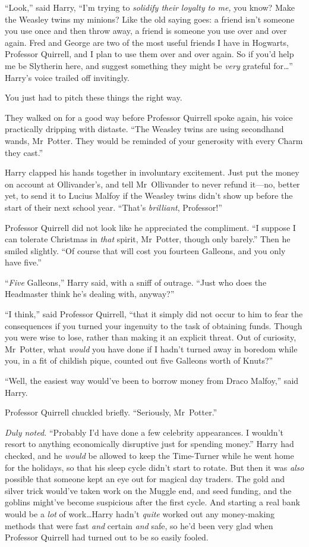 “Look,” said Harry, “I’m trying to \emph{solidify their loyalty to me,} you know? Make the Weasley twins my minions? Like the old saying goes: a friend isn’t someone you use once and then throw away, a friend is someone you use over and over again. Fred and George are two of the most useful friends I have in Hogwarts, Professor Quirrell, and I plan to use them over and over again. So if you’d help me be Slytherin here, and suggest something they might be \emph{very} grateful for…” Harry’s voice trailed off invitingly.

You just had to pitch these things the right way.

They walked on for a good way before Professor Quirrell spoke again, his voice practically dripping with distaste. “The Weasley twins are using secondhand wands, Mr~Potter. They would be reminded of your generosity with every Charm they cast.”

Harry clapped his hands together in involuntary excitement. Just put the money on account at Ollivander’s, and tell Mr~Ollivander to never refund it—no, better yet, to send it to Lucius Malfoy if the Weasley twins didn’t show up before the start of their next school year. “That’s \emph{brilliant}, Professor!”

Professor Quirrell did not look like he appreciated the compliment. “I suppose I can tolerate Christmas in \emph{that} spirit, Mr~Potter, though only barely.” Then he smiled slightly. “Of course that will cost you fourteen Galleons, and you only have five.”

“\emph{Five} Galleons,” Harry said, with a sniff of outrage. “Just who does the Headmaster think he’s dealing with, anyway?”

“I think,” said Professor Quirrell, “that it simply did not occur to him to fear the consequences if you turned your ingenuity to the task of obtaining funds. Though you were wise to lose, rather than making it an explicit threat. Out of curiosity, Mr~Potter, what \emph{would} you have done if I hadn’t turned away in boredom while you, in a fit of childish pique, counted out five Galleons worth of Knuts?”

“Well, the easiest way would’ve been to borrow money from Draco Malfoy,” said Harry.

Professor Quirrell chuckled briefly. “Seriously, Mr~Potter.”

\emph{Duly noted.} “Probably I’d have done a few celebrity appearances. I wouldn’t resort to anything economically disruptive just for spending money.” Harry had checked, and he \emph{would} be allowed to keep the Time-Turner while he went home for the holidays, so that his sleep cycle didn’t start to rotate. But then it was \emph{also} possible that someone kept an eye out for magical day traders. The gold and silver trick would’ve taken work on the Muggle end, and seed funding, and the goblins might’ve become suspicious after the first cycle. And starting a real bank would be a \emph{lot} of work…Harry hadn’t \emph{quite} worked out any money-making methods that were fast \emph{and} certain \emph{and} safe, so he’d been very glad when Professor Quirrell had turned out to be so easily fooled.

